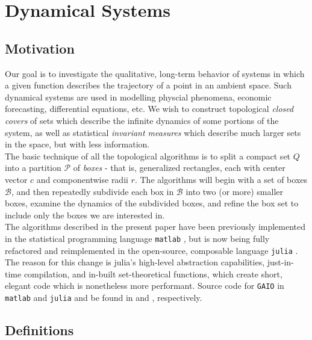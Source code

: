 \section{Dynamical Systems}


\subsection{Motivation}\label{sec:mot}

Our goal is to investigate the qualitative, long-term behavior of systems in which a given 
function describes the trajectory of a point in an ambient space. Such dynamical systems 
are used in modelling physcial phenomena, economic forecasting, differential equations, etc. 
We wish to construct topological \emph{closed covers} of sets which describe the infinite 
dynamics of some portions of the system, as well as statistical \emph{invariant measures} 
which describe much larger sets in the space, but with less information. \\

The basic technique of all the topological algorithms is to split a compact set $Q$ into 
a partition $\mathcal{P}$ of \emph{boxes} - that is, generalized rectangles, each with 
center vector $c$ and componentwise radii $r$. The algorithms will begin with a set of boxes 
$\mathcal{B}$, and then repeatedly subdivide each box in $\mathcal{B}$ into two (or more) 
smaller boxes, examine the dynamics of the subdivided boxes, and refine the box set to 
include only the boxes we are interested in. \\

The algorithms described in the present paper have been previously implemented in the 
statistical programming language \texttt{matlab} \cite*{matlab}, but is now being fully refactored and
reimplemented in the open-source, composable language \texttt{julia} \cite*{julia}. The reason for this 
change is julia's high-level abstraction capabilities, just-in-time compilation, and 
in-built set-theoretical functions, which create short, elegant code which is nonetheless 
more performant. Source code for \texttt{GAIO} in \texttt{matlab} and \texttt{julia} and be 
found in \cite*{oldGAIO} and \cite*{GAIO}, respectively.

\subsection{Definitions}

